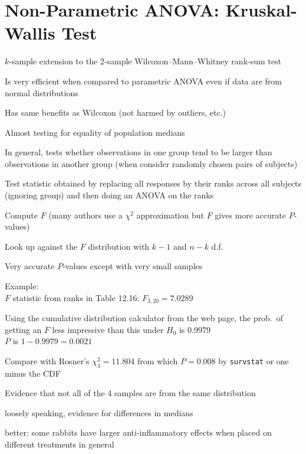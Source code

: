 \section{Non-Parametric ANOVA: Kruskal-Wallis Test}
\bi
\item $k$-sample extension to the 2-sample Wilcoxon--Mann--Whitney
  rank-sum test
\item Is very efficient when compared to parametric ANOVA even if data
  are from normal distributions
\item Has same benefits as Wilcoxon (not harmed by outliers, etc.)
\item Almost testing for equality of population medians
\item In general, tests whether observations in one group tend to be
  larger than observations in another group (when consider randomly
  chosen pairs of subjects)
\item Test statistic obtained by replacing all responses by their
  ranks across all subjects (ignoring group) and then doing an ANOVA
  on the ranks
\item Compute $F$ (many authors use a $\chi^2$ approximation but $F$
  gives more accurate $P$-values)
\item Look up against the $F$ distribution with $k-1$ and $n-k$ d.f.
\item Very accurate $P$-values except with very small samples
\item Example: 
 \\ $F$ statistic from ranks in Table 12.16: $F_{3,20}=7.0289$
\item Using the cumulative distribution calculator from the web page,
  the prob.\ of getting an $F$ less impressive than this under $H_0$
  is 0.9979 \\
  $P$ is $1-0.9979=0.0021$
\item Compare with Rosner's $\chi^{2}_{3}=11.804$ from which $P=0.008$
  by \texttt{survstat} or one minus the CDF
\item Evidence that not all of the 4 samples are from the same
  distribution
 \bi
 \item loosely speaking, evidence for differences in medians
 \item better: some rabbits have larger anti-inflammatory effects
  when placed on different treatments in general
 \ei


